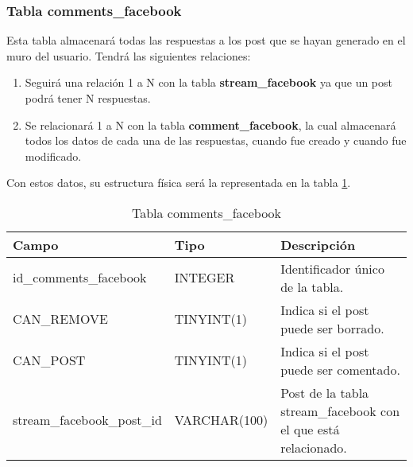 \subsubsection{Tabla comments\_facebook}
Esta tabla almacenará todas las respuestas a los post que se hayan generado en el muro del usuario. Tendrá las siguientes relaciones:
\begin{enumerate}
\item Seguirá una relación 1 a N con la tabla \textbf{stream\_facebook} ya que un post podrá tener N respuestas.
\item Se relacionará 1 a N con la tabla \textbf{comment\_facebook}, la cual almacenará todos los datos de cada una de las respuestas, cuando fue creado y cuando fue modificado.
\end{enumerate}
\bigskip
\par
Con estos datos, su estructura física será la representada en la tabla \ref{tabCommentsFacebook}.

\bigskip
\par
\begin{table}[h]
\begin{center}
\begin{tabular}{| l | l | p{60mm} |}\hline
\textbf{Campo}&\textbf{Tipo}&\textbf{Descripción} \\ \hline
id\_comments\_facebook & INTEGER & Identificador único de la tabla. \\ \hline
CAN\_REMOVE & TINYINT(1) & Indica si el post puede ser borrado. \\ \hline
CAN\_POST & TINYINT(1) & Indica si el post puede ser comentado. \\ \hline
stream\_facebook\_post\_id & VARCHAR(100) & Post de la tabla stream\_facebook con el que está relacionado. \\ \hline
\end{tabular}
\end{center}
\caption{Tabla comments\_facebook} \label{tabCommentsFacebook}
\end{table}

